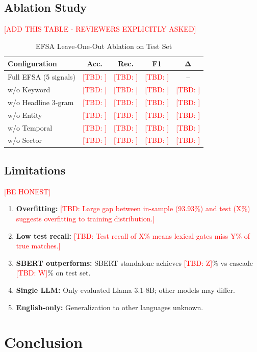 \documentclass[conference]{IEEEtran}
\newcommand{\tbd}[1]{\textcolor{red}{[TBD: #1]}}
\begin{document}
\subsection{Ablation Study}

\textcolor{red}{[ADD THIS TABLE - REVIEWERS EXPLICITLY ASKED]}

\begin{table}[h]
\centering
\caption{EFSA Leave-One-Out Ablation on Test Set}
\label{tab:ablation}
\begin{tabular}{lcccc}
\toprule
Configuration & Acc. & Rec. & F1 & Δ \\
\midrule
Full EFSA (5 signals) & \tbd{} & \tbd{} & \tbd{} & -- \\
w/o Keyword & \tbd{} & \tbd{} & \tbd{} & \tbd{} \\
w/o Headline 3-gram & \tbd{} & \tbd{} & \tbd{} & \tbd{} \\
w/o Entity & \tbd{} & \tbd{} & \tbd{} & \tbd{} \\
w/o Temporal & \tbd{} & \tbd{} & \tbd{} & \tbd{} \\
w/o Sector & \tbd{} & \tbd{} & \tbd{} & \tbd{} \\
\bottomrule
\end{tabular}
\end{table}

\subsection{Limitations}

\textcolor{red}{[BE HONEST]}

\begin{enumerate}
    \item \textbf{Overfitting:} \tbd{Large gap between in-sample (93.93\%) and test (X\%) suggests overfitting to training distribution.}
    \item \textbf{Low test recall:} \tbd{Test recall of X\% means lexical gates miss Y\% of true matches.}
    \item \textbf{SBERT outperforms:} SBERT standalone achieves \tbd{Z}\% vs cascade \tbd{W}\% on test set.
    \item \textbf{Single LLM:} Only evaluated Llama 3.1-8B; other models may differ.
    \item \textbf{English-only:} Generalization to other languages unknown.
\end{enumerate}

\section{Conclusion}
\end{document}
